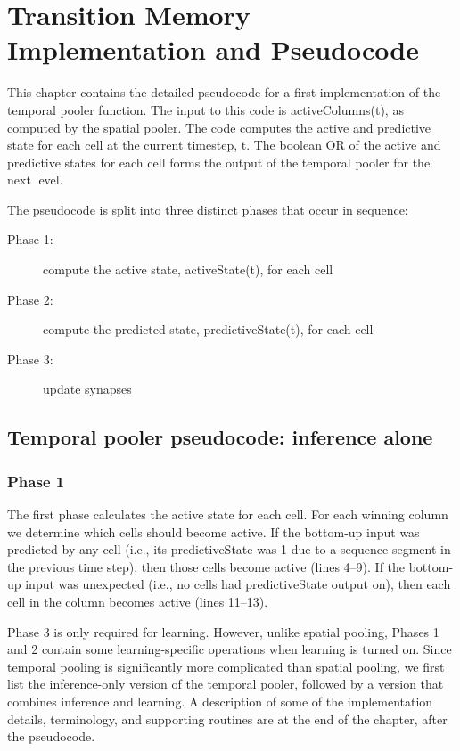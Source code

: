 

\chapter{Transition Memory Implementation and Pseudocode}
\label{chapter:transition-memory}
This chapter contains the detailed pseudocode for a first
implementation of the temporal pooler function. The input to this code
is activeColumns(t), as computed by the spatial pooler. The code
computes the active and predictive state for each cell at the current
timestep, t. The boolean OR of the active and predictive states for
each cell forms the output of the temporal pooler for the next level.

The pseudocode is split into three distinct phases that occur in sequence:
\begin{description}
\item[Phase 1:] compute the active state, activeState(t), for each cell
\item[Phase 2:] compute the predicted state, predictiveState(t), for each cell
\item[Phase 3:] update synapses
\end{description}

\section*{Temporal pooler pseudocode: inference alone}

\subsection*{Phase 1}
The first phase calculates the active state for each cell. For each
winning column we determine which cells should become active. If the
bottom-up input was predicted by any cell (i.e., its predictiveState
was 1 due to a sequence segment in the previous time step), then those
cells become active (lines 4--9). If the bottom-up input was unexpected
(i.e., no cells had predictiveState output on), then each cell in the
column becomes active (lines 11--13).

Phase 3 is only required for learning. However, unlike spatial
pooling, Phases 1 and 2 contain some learning-specific operations when
learning is turned on. Since temporal pooling is significantly more
complicated than spatial pooling, we first list the inference-only
version of the temporal pooler, followed by a version that combines
inference and learning. A description of some of the implementation
details, terminology, and supporting routines are at the end of the
chapter, after the pseudocode.

